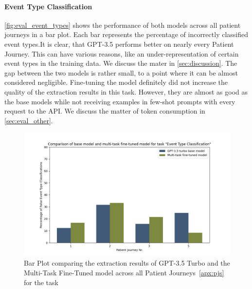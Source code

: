 \paragraph{Event Type Classification} \autoref{fig:eval_event_types} shows the performance of both models across all patient journeys in a bar plot. Each bar represents the percentage of incorrectly classified event types.It is clear, that GPT-3.5 performs better on nearly every Patient Journey. This can have various reasons, like an under-representation of certain event types in the training data. We discuss the mater in \autoref{sec:discussion}. The gap between the two models is rather small, to a point where it can be almost considered negligible. Fine-tuning the model definitely did not increase the quality of the extraction results in this task. However, they are almost as good as the base models while not receiving examples in few-shot prompts with every request to the API. We discuss the matter of token consumption in \autoref{sec:eval_other}.
\begin{figure}
    \centering
    \includegraphics[width=\textwidth]{bachelor_thesis/images/event_types_all.png}
    \caption{Bar Plot comparing the extraction results of GPT-3.5 Turbo and the Multi-Task Fine-Tuned model across all Patient Journeys~\ref{apx:pjs} for the task }
    \label{fig:eval_event_types}
\end{figure}


